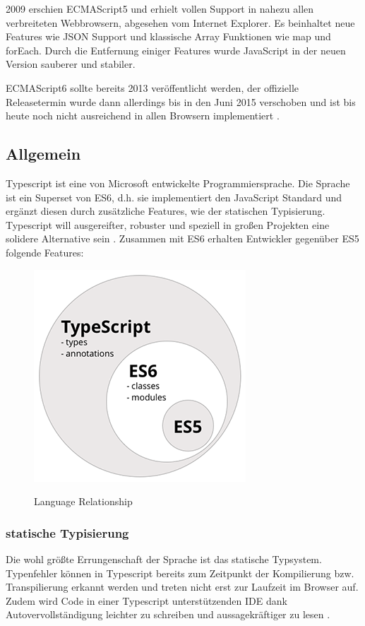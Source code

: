 2009 erschien ECMAScript5 und erhielt vollen Support in nahezu allen verbreiteten Webbrowsern, abgesehen vom Internet Explorer.
Es beinhaltet neue Features wie \ac{JSON} Support und klassische Array Funktionen wie map und forEach.
Durch die Entfernung einiger Features wurde JavaScript in der neuen Version sauberer und stabiler.

ECMAScript6 sollte bereits 2013 veröffentlicht werden, der offizielle Releasetermin wurde
dann allerdings bis in den Juni 2015 verschoben und ist bis heute noch nicht ausreichend in allen Browsern implementiert
\cite{js-vs-es}.

\subsection{Allgemein}

Typescript ist eine von Microsoft entwickelte Programmiersprache.
Die Sprache ist ein Superset von ES6, d.h. sie implementiert den JavaScript Standard und ergänzt diesen
durch zusätzliche Features, wie der statischen Typisierung.
Typescript will ausgereifter, robuster und speziell in großen Projekten eine solidere Alternative sein \cite[28]{EssentialTS}.
Zusammen mit ES6 erhalten Entwickler gegenüber ES5 folgende Features:

\begin{figure}[ht]
 \centering
 \includegraphics[width=0.4\linewidth]{kapitel2/typescript----es5-es6-typescript-circle-diagram.png}
 \caption{Language Relationship}\cite[152]{ng-Book-2}
\end{figure}


\subsubsection{statische Typisierung}

Die wohl größte Errungenschaft der Sprache ist das statische Typsystem.
Typenfehler können in Typescript bereits zum Zeitpunkt
der Kompilierung bzw. Transpilierung erkannt werden und treten nicht erst zur Laufzeit im Browser auf.
Zudem wird Code in einer Typescript unterstützenden IDE dank Autovervollständigung
leichter zu schreiben und aussagekräftiger zu lesen \cite[156]{ng-Book-2}.

